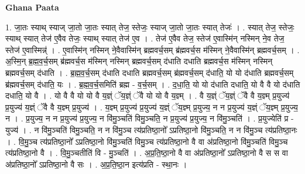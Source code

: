 \documentclass[17pt]{extarticle}
\begin{document}
\textbf{Ghana Paata } \newline

1. जा॒तः स्याथ् स्याज् जा॒तो जा॒तः स्यात् तेज॒ स्तेजः॒ स्याज् जा॒तो जा॒तः स्यात् तेजः॑ । . स्यात् तेज॒ स्तेजः॒ स्याथ् स्यात् तेज॑ ए॒वैव तेजः॒ स्याथ् स्यात् तेज॑ ए॒व । . तेज॑ ए॒वैव तेज॒ स्तेज॑ ए॒वास्मि॑न् नस्मिन् ने॒व तेज॒ स्तेज॑ ए॒वास्मिन्न्॑ । . ए॒वास्मि॑न् नस्मिन् ने॒वैवास्मि॑न् ब्रह्मवर्च॒सम् ब्र॑ह्मवर्च॒स म॑स्मिन् ने॒वैवास्मि॑न् ब्रह्मवर्च॒सम् । . अ॒स्मि॒न् ब्र॒ह्म॒व॒र्च॒सम् ब्र॑ह्मवर्च॒स म॑स्मिन् नस्मिन् ब्रह्मवर्च॒सम् द॑धाति दधाति ब्रह्मवर्च॒स म॑स्मिन् नस्मिन् ब्रह्मवर्च॒सम् द॑धाति । . ब्र॒ह्म॒व॒र्च॒सम् द॑धाति दधाति ब्रह्मवर्च॒सम् ब्र॑ह्मवर्च॒सम् द॑धाति॒ यो यो द॑धाति ब्रह्मवर्च॒सम् ब्र॑ह्मवर्च॒सम् द॑धाति॒ यः । . ब्र॒ह्म॒व॒र्च॒समिति॑ ब्रह्म - व॒र्च॒सम् । . द॒धा॒ति॒ यो यो द॑धाति दधाति॒ यो वै वै यो द॑धाति दधाति॒ यो वै । . यो वै वै यो यो वै य॒ज्ञ्ं ॅय॒ज्ञ्ं ॅवै यो यो वै य॒ज्ञ्म् । . वै य॒ज्ञ्ं ॅय॒ज्ञ्ं ॅवै वै य॒ज्ञ्म् प्र॒युज्य॑ प्र॒युज्य॑ य॒ज्ञ्ं ॅवै वै य॒ज्ञ्म् प्र॒युज्य॑ । . य॒ज्ञ्म् प्र॒युज्य॑ प्र॒युज्य॑ य॒ज्ञ्ं ॅय॒ज्ञ्म् प्र॒युज्य॒ न न प्र॒युज्य॑ य॒ज्ञ्ं ॅय॒ज्ञ्म् प्र॒युज्य॒ न । . प्र॒युज्य॒ न न प्र॒युज्य॑ प्र॒युज्य॒ न वि॑मु॒ञ्चति॑ विमु॒ञ्चति॒ न प्र॒युज्य॑ प्र॒युज्य॒ न वि॑मु॒ञ्चति॑ । . प्र॒युज्येति॑ प्र - युज्य॑ । . न वि॑मु॒ञ्चति॑ विमु॒ञ्चति॒ न न वि॑मु॒ञ्च त्य॑प्रतिष्ठा॒नो᳚ ऽप्रतिष्ठा॒नो वि॑मु॒ञ्चति॒ न न वि॑मु॒ञ्च त्य॑प्रतिष्ठा॒नः । . वि॒मु॒ञ्च त्य॑प्रतिष्ठा॒नो᳚ ऽप्रतिष्ठा॒नो वि॑मु॒ञ्चति॑ विमु॒ञ्च त्य॑प्रतिष्ठा॒नो वै वा अ॑प्रतिष्ठा॒नो वि॑मु॒ञ्चति॑ विमु॒ञ्च त्य॑प्रतिष्ठा॒नो वै । . वि॒मु॒ञ्चतीति॑ वि - मु॒ञ्चति॑ । . अ॒प्र॒ति॒ष्ठा॒नो वै वा अ॑प्रतिष्ठा॒नो᳚ ऽप्रतिष्ठा॒नो वै स स वा अ॑प्रतिष्ठा॒नो᳚ ऽप्रतिष्ठा॒नो वै सः । . अ॒प्र॒ति॒ष्ठा॒न इत्य॑प्रति - स्था॒नः । \newline
\end{document}
